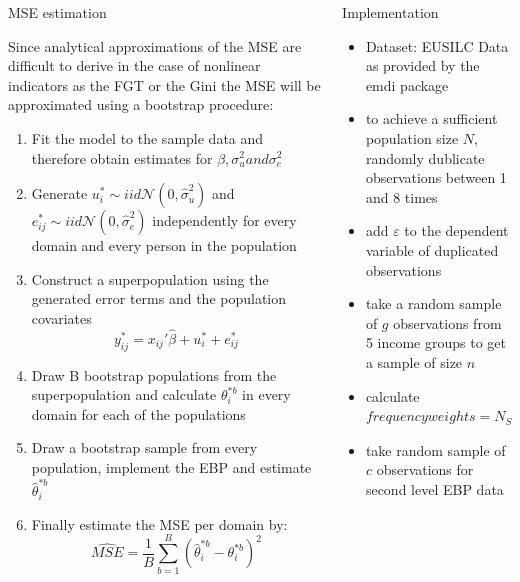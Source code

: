 \documentclass[fleqn,final]{beamer}
\newcommand{\Pheight}{\rule[-5mm]{0cm}{1cm}}
\begin{document}
\begin{frame}
\begin{columns}[t]
\begin{column}{.3\linewidth}
\begin{block}{MSE estimation \Pheight}
Since analytical approximations of the MSE are difficult to derive in the case of nonlinear indicators as the FGT or the Gini the MSE will be approximated using a bootstrap procedure:
\begin{enumerate}
\item Fit the model to the sample data and therefore obtain estimates for $\beta, \sigma_{u}^2 and \sigma_{e}^2$
\item Generate $u_{i}^*\sim iid \mathcal{N}(0,\hat{\sigma}_{u}^2)$ and $e_{ij}^*\sim iid \mathcal{N}(0,\hat{\sigma}_{e}^2)$ independently for every domain and every person in the population
\item Construct a superpopulation using the generated error terms and the population covariates
\[y_{ij}^*=x_{ij}\prime\hat{\beta}+u_{i}^*+e_{ij}^*\]
\item Draw B bootstrap populations from the superpopulation and calculate $\theta_{i}^{*b}$ in every domain for each of the populations
\item Draw a bootstrap sample from every population, implement the EBP and estimate $\hat{\theta}_{i}^{*b}$
\item Finally estimate the MSE per domain by: 
\[\hat{MSE}=\frac{1}{B}\sum_{b=1}^B (\hat{\theta}_{i}^{*b}-\theta_{i}^{*b})^2\]
\end{enumerate}
\end{block}
\end{column}    



%



\begin{column}{.3\linewidth}


\begin{block}{Implementation \Pheight}
\begin{itemize}
\item Dataset: EUSILC Data as provided by the emdi package
\item to achieve a sufficient population size $N$, randomly dublicate observations between 1 and 8 times
\item add $\varepsilon$ to the dependent variable of duplicated observations
\item take a random sample of $g$ observations from 5 income groups to get a sample of size $n$
\item calculate $frequency weights = N_{SMA,income group}/n_{SMA}/5 $
\item take random sample of $c$ observations for second level EBP data 
 

\end{itemize}
\end{block}
\end{column}
\end{columns}
\end{frame}
\end{document}
